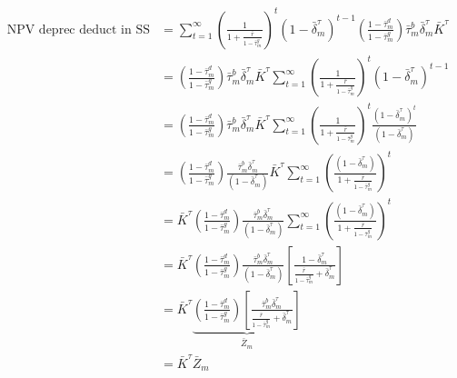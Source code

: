 \documentclass[letterpaper,12pt]{article}
\theoremstyle{definition}
\begin{document}
\begin{spacing}{1.5}
\begin{equation}
\label{eqn:NPV_deprec_ss}
\begin{split}
\text{NPV deprec deduct in SS} & = \sum_{t=1}^{\infty}  \left(\frac{1}{1+\frac{\bar{r}}{1-\bar{\tau}^{g}_{m}}} \right)^{t}(1-\bar{\delta}^{\tau}_{m})^{t-1}\left(\frac{1-\bar{\tau}^{d}_{m}}{1-\bar{\tau}^{g}_{m}}\right) \bar{\tau}^{b}_{m}\bar{\delta}^{\tau}_{m}\bar{K}^{\tau} \\
& = \left(\frac{1-\bar{\tau}^{d}_{m}}{1-\bar{\tau}^{g}_{m}}\right) \bar{\tau}^{b}_{m}\bar{\delta}^{\tau}_{m}\bar{K}^{\tau} \sum_{t=1}^{\infty}  \left(\frac{1}{1+\frac{\bar{r}}{1-\bar{\tau}^{g}_{m}}} \right)^{t}(1-\bar{\delta}^{\tau}_{m})^{t-1}\\
& = \left(\frac{1-\bar{\tau}^{d}_{m}}{1-\bar{\tau}^{g}_{m}}\right) \bar{\tau}^{b}_{m}\bar{\delta}^{\tau}_{m}\bar{K}^{\tau} \sum_{t=1}^{\infty}  \left(\frac{1}{1+\frac{\bar{r}}{1-\bar{\tau}^{g}_{m}}} \right)^{t}\frac{(1-\bar{\delta}^{\tau}_{m})^{t}}{(1-\bar{\delta}^{\tau}_{m})} \\
& = \left(\frac{1-\bar{\tau}^{d}_{m}}{1-\bar{\tau}^{g}_{m}}\right) \frac{\bar{\tau}^{b}_{m}\bar{\delta}^{\tau}_{m}}{(1-\bar{\delta}^{\tau}_{m})}\bar{K}^{\tau} \sum_{t=1}^{\infty}  \left(\frac{(1-\bar{\delta}^{\tau}_{m})}{1+\frac{\bar{r}}{1-\bar{\tau}^{g}_{m}}} \right)^{t} \\
& =\bar{K}^{\tau} \left(\frac{1-\bar{\tau}^{d}_{m}}{1-\bar{\tau}^{g}_{m}}\right) \frac{\bar{\tau}^{b}_{m}\bar{\delta}^{\tau}_{m}}{(1-\bar{\delta}^{\tau}_{m})} \sum_{t=1}^{\infty}  \left(\frac{(1-\bar{\delta}^{\tau}_{m})}{1+\frac{\bar{r}}{1-\bar{\tau}^{g}_{m}}} \right)^{t} \\
& =\bar{K}^{\tau} \left(\frac{1-\bar{\tau}^{d}_{m}}{1-\bar{\tau}^{g}_{m}}\right) \frac{\bar{\tau}^{b}_{m}\bar{\delta}^{\tau}_{m}}{(1-\bar{\delta}^{\tau}_{m})} \left[\frac{1-\bar{\delta}^{\tau}_{m}}{\frac{\bar{r}}{1-\bar{\tau}^{g}_{m}}+\bar{\delta}^{\tau}_{m}}\right]\\
& =\bar{K}^{\tau} \underbrace{\left(\frac{1-\bar{\tau}^{d}_{m}}{1-\bar{\tau}^{g}_{m}}\right) \left[\frac{\bar{\tau}^{b}_{m}\bar{\delta}^{\tau}_{m}}{\frac{\bar{r}}{1-\bar{\tau}^{g}_{m}}+\bar{\delta}^{\tau}_{m}}\right]}_{\bar{Z}_{m}}\\
& =\bar{K}^{\tau} \bar{Z}_{m}\\
\end{split}
\end{equation}



\end{spacing}
\end{document}
